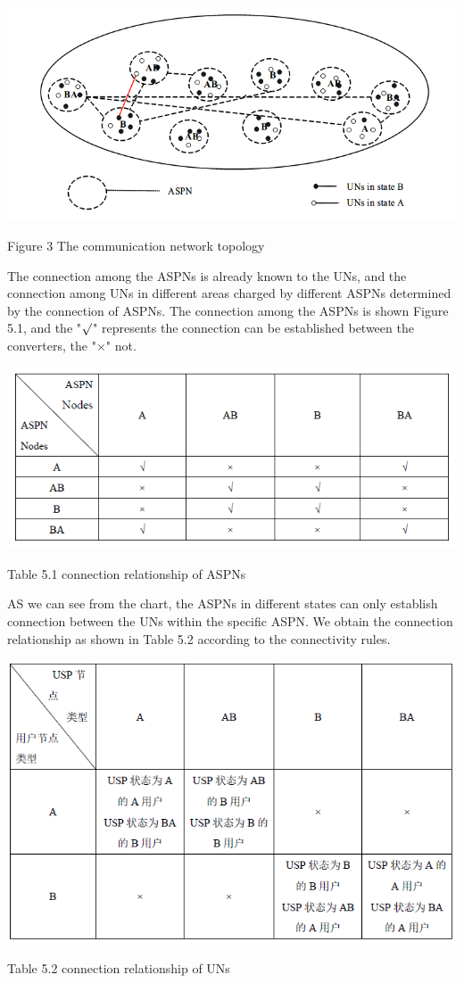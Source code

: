 \documentclass{article}
\begin{document}
\centerline{\includegraphics[width=.6\textwidth]{Figure3.png}}
\centerline{Figure 3 The communication network topology }


The connection among the ASPNs is already known to the UNs, and the connection among UNs in different areas charged by
different ASPNs determined by the connection of ASPNs. The connection among the ASPNs is shown Figure 5.1, and the
"\(\surd\)" represents the connection can be established between the converters, the "\(\times\)" not.
\par
\centerline{\includegraphics[width=.7\textwidth]{Table1.png}}
\centerline{Table 5.1 connection relationship of ASPNs}

AS we can see from the chart, the ASPNs in different states can only establish connection between the UNs within the
specific ASPN. We obtain the connection relationship as shown in Table 5.2 according to the connectivity rules.
\par
\centerline{\includegraphics[width=.5\textwidth]{Table2.png}}
\centerline{Table 5.2 connection relationship of UNs}
\end{document}
